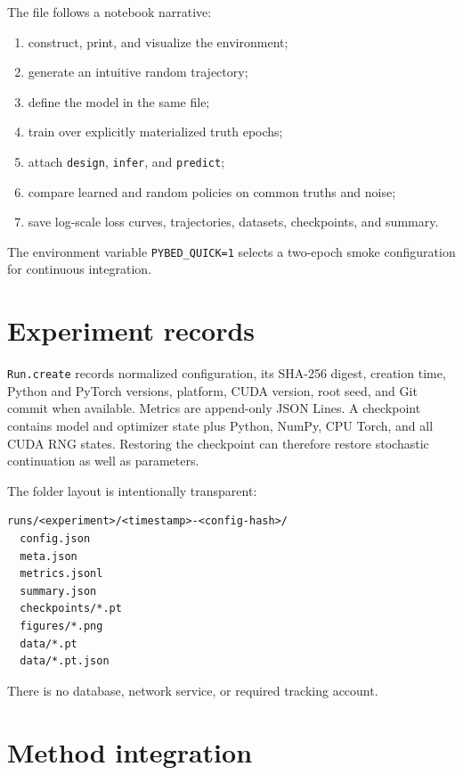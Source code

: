 \documentclass[11pt]{article}
\begin{document}
The file follows a notebook narrative:
\begin{enumerate}
  \item construct, print, and visualize the environment;
  \item generate an intuitive random trajectory;
  \item define the model in the same file;
  \item train over explicitly materialized truth epochs;
  \item attach \texttt{design}, \texttt{infer}, and \texttt{predict};
  \item compare learned and random policies on common truths and noise;
  \item save log-scale loss curves, trajectories, datasets, checkpoints, and summary.
\end{enumerate}
The environment variable \texttt{PYBED\_QUICK=1} selects a two-epoch smoke
configuration for continuous integration.

\section{Experiment records}

\texttt{Run.create} records normalized configuration, its SHA-256 digest, creation
time, Python and PyTorch versions, platform, CUDA version, root seed, and Git commit
when available. Metrics are append-only JSON Lines. A checkpoint contains model and
optimizer state plus Python, NumPy, CPU Torch, and all CUDA RNG states. Restoring the
checkpoint can therefore restore stochastic continuation as well as parameters.

The folder layout is intentionally transparent:
\begin{lstlisting}
runs/<experiment>/<timestamp>-<config-hash>/
  config.json
  meta.json
  metrics.jsonl
  summary.json
  checkpoints/*.pt
  figures/*.png
  data/*.pt
  data/*.pt.json
\end{lstlisting}
There is no database, network service, or required tracking account.

\section{Method integration}
\end{document}
